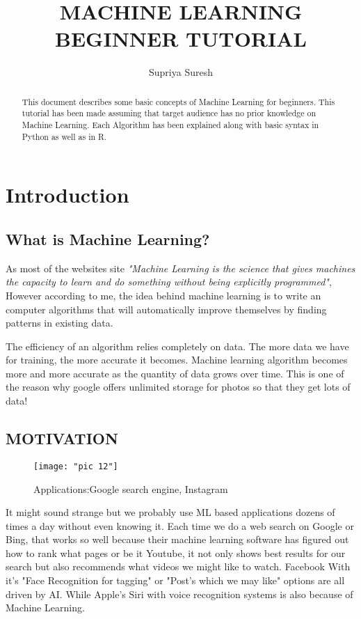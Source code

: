 \documentclass[Proceedings]{ascelike}
\title{MACHINE LEARNING BEGINNER TUTORIAL}
\author{Supriya Suresh}
\begin{document}
\maketitle

\tableofcontents

\newpage
\begin{abstract}
This document describes some basic concepts of Machine Learning for beginners. This tutorial has been made assuming that target audience has no prior knowledge on Machine Learning. Each Algorithm has been explained along with basic syntax in Python as well as in R. 
\end{abstract}


\section{Introduction}

\subsection{What is Machine Learning?}
As most of the websites site \textit{"Machine Learning is the science that gives machines the capacity to learn and do something without being explicitly programmed"}, However according to me, the idea behind machine learning is to write an computer algorithms that will automatically improve themselves by finding patterns in existing data.

The efficiency of an algorithm relies completely on data. The more data we have for training, the more accurate it becomes. Machine learning algorithm becomes more and more accurate as the quantity of data grows over time. This is one of the reason why google offers unlimited storage for photos so that they get lots of data!\\

\subsection{MOTIVATION}
\begin{figure}[!ht]
	\texttt{[image: "pic 12"]}
	\caption{Applications:Google search engine, Instagram}
	\label{fig:pic-12}
\end{figure}
\newpage
It might sound strange but we probably use ML based applications dozens of times a day without even knowing it. Each time we do a web search on Google or Bing, that works so well because their machine learning software has figured out how to rank what pages or be it Youtube, it not only shows best results for our search but also recommends what videos we might like to watch. Facebook With it's "Face Recognition for tagging" or "Post's which we may like" options are all driven by AI. While Apple's Siri with voice recognition systems is also because of Machine Learning.\\
\end{document}
